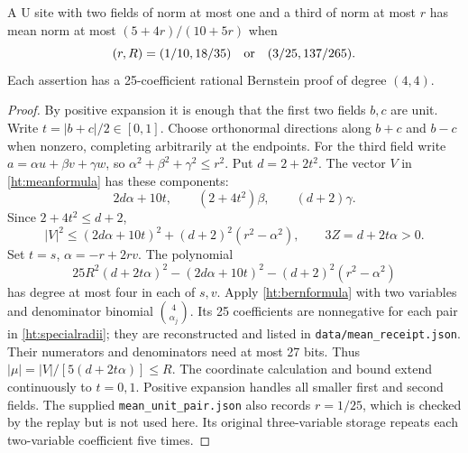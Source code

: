 \begin{htlem}\label{ht:specialmean}
A U site with two fields of norm at most one and a third of norm at most
\(r\) has mean norm at most \((5+4r)/(10+5r)\) when
\begin{equation}\label{ht:specialradii}
 (r,R)=(1/10,18/35)\quad\hbox{or}\quad(3/25,137/265).
\end{equation}
Each assertion has a 25-coefficient rational Bernstein proof of degree
\((4,4)\).
\end{htlem}
\begin{proof}
By positive expansion it is enough that the first two fields \(b,c\)
are unit. Write \(t=|b+c|/2\in[0,1]\). Choose orthonormal directions
along \(b+c\) and \(b-c\) when nonzero, completing arbitrarily at
the endpoints. For the third field write \(a=\alpha u+\beta v+\gamma w\),
so \(\alpha^2+\beta^2+\gamma^2\le r^2\). Put \(d=2+2t^2\).
The vector \(V\) in \eqref{ht:meanformula} has these components:
\[
 2d\alpha+10t,\qquad (2+4t^2)\beta,\qquad (d+2)\gamma.
\]
Since \(2+4t^2\le d+2\),
\begin{equation}\label{ht:specialpoly}
 |V|^2\le(2d\alpha+10t)^2+(d+2)^2(r^2-\alpha^2),\qquad
 3Z=d+2t\alpha>0.
\end{equation}
Set \(t=s\), \(\alpha=-r+2rv\). The polynomial
\[
 25R^2(d+2t\alpha)^2-(2d\alpha+10t)^2
                         -(d+2)^2(r^2-\alpha^2)
\]
has degree at most four in each of \(s,v\). Apply
\eqref{ht:bernformula} with two variables and denominator binomial
\(\binom4{\alpha_j}\). Its 25 coefficients are nonnegative for each
pair in \eqref{ht:specialradii}; they are reconstructed and listed in
\texttt{data/mean\_receipt.json}. Their numerators and denominators need
at most 27 bits. Thus \(|\mu|=|V|/[5(d+2t\alpha)]\le R\).
The coordinate calculation and bound extend continuously to \(t=0,1\).
Positive expansion handles all smaller first and second fields.
The supplied \texttt{mean\_unit\_pair.json} also records \(r=1/25\),
which is checked by the replay but is not used here. Its original
three-variable storage repeats each two-variable coefficient five times.
\end{proof}

